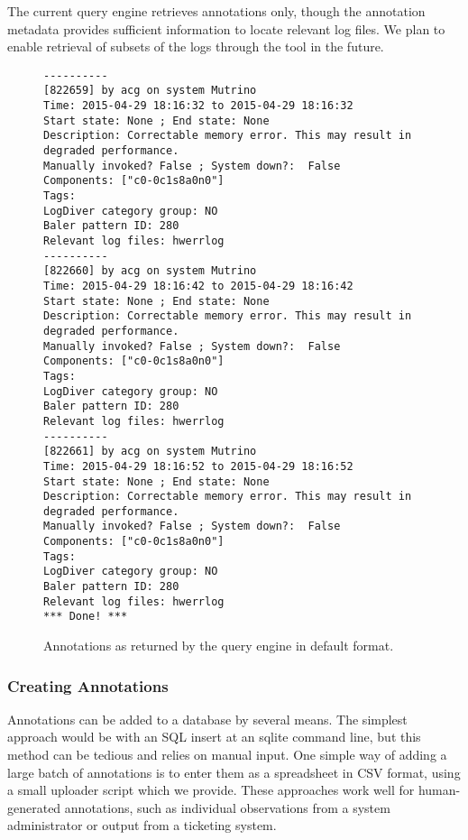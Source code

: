 The current query engine retrieves annotations only, though the annotation metadata provides sufficient information to locate relevant log files. We plan to enable retrieval of subsets of the logs through the tool in the future.

\begin{figure}
\begin{small}
\begin{verbatim}
----------
[822659] by acg on system Mutrino
Time: 2015-04-29 18:16:32 to 2015-04-29 18:16:32
Start state: None ; End state: None
Description: Correctable memory error. This may result in degraded performance.
Manually invoked? False ; System down?:  False
Components: ["c0-0c1s8a0n0"]
Tags:
LogDiver category group: NO
Baler pattern ID: 280
Relevant log files: hwerrlog
----------
[822660] by acg on system Mutrino
Time: 2015-04-29 18:16:42 to 2015-04-29 18:16:42
Start state: None ; End state: None
Description: Correctable memory error. This may result in degraded performance.
Manually invoked? False ; System down?:  False
Components: ["c0-0c1s8a0n0"]
Tags:
LogDiver category group: NO
Baler pattern ID: 280
Relevant log files: hwerrlog
----------
[822661] by acg on system Mutrino
Time: 2015-04-29 18:16:52 to 2015-04-29 18:16:52
Start state: None ; End state: None
Description: Correctable memory error. This may result in degraded performance.
Manually invoked? False ; System down?:  False
Components: ["c0-0c1s8a0n0"]
Tags:
LogDiver category group: NO
Baler pattern ID: 280
Relevant log files: hwerrlog
*** Done! ***

\end{verbatim}
\end{small}
\caption{Annotations as returned by the query engine in default format. }
\label{f:default_format}
\end{figure}


\subsubsection{Creating Annotations}


Annotations can be added to a database by several means. The simplest approach would be with an SQL insert at an sqlite command line, but this method can be tedious and relies on manual input. One simple way of adding a large batch of annotations is to enter them as a spreadsheet in CSV format, using a small uploader script which we provide. These approaches work well for human-generated annotations, such as individual observations from a system administrator or output from a ticketing system.

